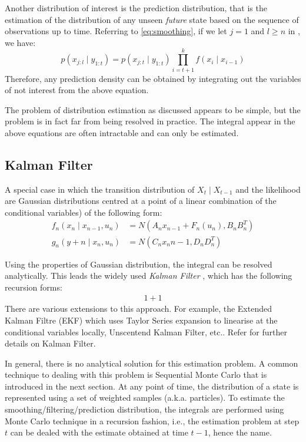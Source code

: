 Another distribution of interest is  the prediction distribution, that is the estimation of the distribution of any unseen \emph{future} state based on the sequence of observations up to time. Referring to \eqref{eq:smoothing}, if we let $j = 1$ and $l \geq n$ in , we have:
\begin{equation}
  p(x_{j:l} \mid y_{1:t}) = p(x_{j:t} \mid y_{1:t}) \prod^k_{i=t+1} f(x_i \mid x_{i-1})
\end{equation}
Therefore, any prediction density can be obtained by integrating out the variables of not interest from the above equation.

The problem of distribution estimation as discussed appears to be simple, but the problem is in fact far from being resolved in practice. The integral appear in the above equations are often intractable and can only be estimated.

\subsection{Kalman Filter}
A special case in which the transition distribution of $X_t \mid X_{t-1}$ and the likelihood are Gaussian distributions centred at a point of a linear combination of the conditional variables) of the following form:
\begin{align}
  f_n(x_n \mid x_{n-1}, u_n) &= N(A_n x_{n-1} + F_n(u_n), B_n B^T_n) \nonumber \\
  g_n(y+n \mid x_n, u_n)    &= N(C_n x_n{n-1}, D_nD^T_n)
\end{align}

Using the properties of Gaussian distribution, the integral can be resolved analytically. This leads the widely used \emph{Kalman Filter} \cite{KGE60}, which has the following recursion forms:
\begin{align}
  1+1
\end{align}
There are various extensions to this approach. For example, the Extended Kalman Filtre (EKF) which uses Taylor Series expansion to linearise at the conditional variables locally, Unscentend Kalman Filter, etc.. Refer \cite{WG95} for further details on Kalman Filter.

In general, there is no analytical solution for this estimation problem. A common  technique to dealing with this problem is Sequential Monte Carlo that is introduced in the next section. At any point of time, the distribution of a state is represented using a set of weighted samples (a.k.a. particles). To estimate the smoothing/filtering/prediction distribution, the integrals are performed using Monte Carlo technique in a recursion fashion, i.e., the estimation problem at step $t$ can be dealed with the estimate obtained at time $t-1$, hence the name.

